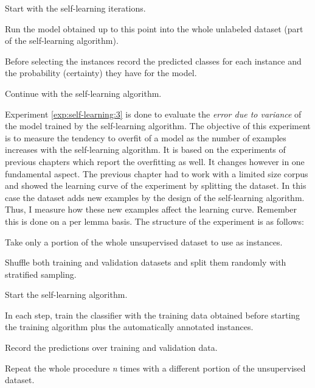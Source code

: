 \begin{experiment}\label{exp:self-learning:2}
  \begin{enumexp}
    \item Start with the self-learning iterations.
    \item Run the model obtained up to this point into the whole unlabeled
      dataset (part of the self-learning algorithm).
    \item Before selecting the instances record the predicted classes for each
      instance and the probability (certainty) they have for the model.
    \item Continue with the self-learning algorithm.
  \end{enumexp}
\end{experiment}

Experiment \ref{exp:self-learning:3} is done to evaluate the {\em error due to
variance} of the model trained by the self-learning algorithm. The objective of
this experiment is to measure the tendency to overfit of a model as the number
of examples increases with the self-learning algorithm. It is based on the
experiments of previous chapters which report the overfitting as well. It
changes however in one fundamental aspect. The previous chapter had to work
with a limited size corpus and showed the learning curve of the experiment by
splitting the dataset. In this case the dataset adds new examples by the design
of the self-learning algorithm. Thus, I measure how these new examples affect
the learning curve. Remember this is done on a per lemma basis. The structure
of the experiment is as follows:

\begin{experiment}\label{exp:self-learning:3}
  \begin{enumexp}
    \item Take only a portion of the whole unsupervised dataset to use as
      instances.
    \item Shuffle both training and validation datasets and split them randomly
      with stratified sampling.
    \item Start the self-learning algorithm.
    \item In each step, train the classifier with the training data obtained
      before starting the training algorithm plus the automatically annotated
      instances.
    \item Record the predictions over training and validation data.
    \item Repeat the whole procedure {\em n} times with a different portion of
      the unsupervised dataset.
  \end{enumexp}
\end{experiment}

